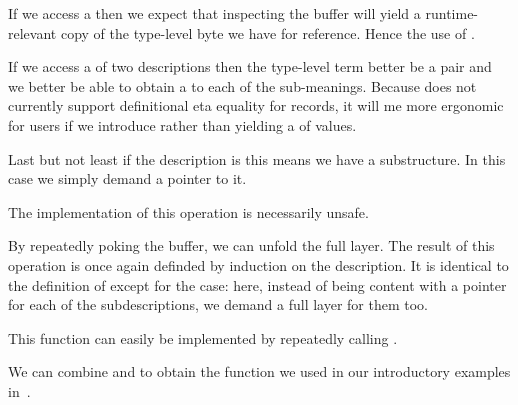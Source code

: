 If we access a  then we expect that inspecting the
buffer will yield a runtime-relevant copy of the type-level byte we
have for reference. Hence the use of .

If we access a  of two descriptions then the type-level term
better be a pair and we better be able to obtain a 
to each of the sub-meanings.
%
Because \idris{} does not currently support definitional eta equality
for records, it will me more ergonomic for users if we introduce
 rather than yielding a  of values.

Last but not least if the description is  this means
we have a substructure. In this case we simply demand a pointer to it.








The implementation of this operation is necessarily unsafe.


By repeatedly poking the buffer, we can unfold the full layer.
The result of this operation is once again definded by induction
on the description. It is identical to the definition of
 except for the  case:
here, instead of being content with a pointer for each of the
subdescriptions, we demand a full layer for them too.


This function can easily be implemented by repeatedly calling
.







We can combine  and  to obtain
the  function we used in our introductory examples
in~.








